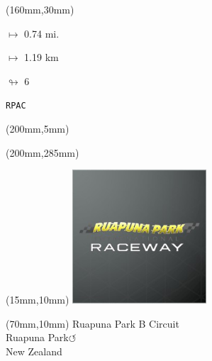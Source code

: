 \begin{textblock*}{40mm}(160mm,30mm)%
\Large
\par$\mapsto$ 0.74 mi.
\par$\mapsto$ 1.19 km
\par$\looparrowright$ 6
\par\hfill\tiny\tt RPAC\\
\end{textblock*}
\begin{textblock*}{20mm}(200mm,5mm)%
\fbox{\thepage}
\label{RPAC}
\end{textblock*}
\begin{textblock*}{20mm}(200mm,285mm)%
\fbox{\thepage}
\end{textblock*}

\null\newpage
\begin{textblock*}{50mm}(15mm,10mm)%
\includegraphics[width=50mm]{LG/RUPU.png}
\end{textblock*}
\begin{textblock*}{130mm}(70mm,10mm)%
{\fontsize{20}{20}\selectfont Ruapuna Park B Circuit\\}
{\fontsize{16}{16}\selectfont Ruapuna Park\hfill \Large$\circlearrowleft$\\}
{\fontsize{12}{12}\selectfont New Zealand\\}
\end{textblock*}
